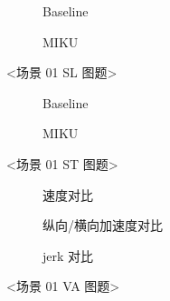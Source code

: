 
\begin{figure}[H]
\centering
\begin{subfigure}[b]{\textwidth}
  \centering
  
  \caption{Baseline}
  \label{fig:exp_01_crossing_ped_sl:a}
\end{subfigure}

\begin{subfigure}[b]{\textwidth}
  \centering
  
  \caption{MIKU}
  \label{fig:exp_01_crossing_ped_sl:b}
\end{subfigure}
\caption{<场景 01 SL 图题>}
\label{fig:exp_01_crossing_ped_sl}
\end{figure}

\begin{figure}[H]
\centering
\begin{subfigure}[b]{0.48\textwidth}
  \centering
  
  \caption{Baseline}
  \label{fig:exp_01_crossing_ped_st:a}
\end{subfigure}\hfill
\begin{subfigure}[b]{0.48\textwidth}
  \centering
  
  \caption{MIKU}
  \label{fig:exp_01_crossing_ped_st:b}
\end{subfigure}
\caption{<场景 01 ST 图题>}
\label{fig:exp_01_crossing_ped_st}
\end{figure}

\begin{figure}[H]
\centering
\begin{subfigure}[b]{\textwidth}
  \centering
  
  \caption{速度对比}
  \label{fig:exp_01_crossing_ped_va:a}
\end{subfigure}

\begin{subfigure}[b]{\textwidth}
  \centering
  
  \caption{纵向/横向加速度对比}
  \label{fig:exp_01_crossing_ped_va:b}
\end{subfigure}

\begin{subfigure}[b]{\textwidth}
  \centering
  
  \caption{jerk 对比}
  \label{fig:exp_01_crossing_ped_va:c}
\end{subfigure}
\caption{<场景 01 VA 图题>}
\label{fig:exp_01_crossing_ped_va}
\end{figure}

